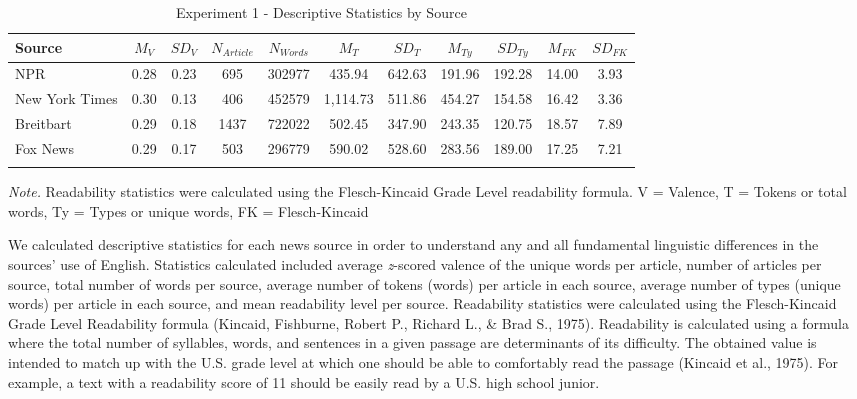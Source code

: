 \documentclass[
  english,
  man]{apa6}
\begin{document}
\begin{table}[tbp]

\begin{center}
\begin{threeparttable}

\caption{\label{tab:exp1-source-descriptives}Experiment 1 - Descriptive Statistics by Source}

\footnotesize{

\begin{tabular}{lcccccccccc}
\toprule
Source & $M_V$ & $SD_V$ & $N_{Article}$ & $N_{Words}$ & $M_T$ & $SD_T$ & $M_{Ty}$ & $SD_{Ty}$ & $M_{FK}$ & $SD_{FK}$\\
\midrule
NPR & 0.28 & 0.23 & 695 & 302977 & 435.94 & 642.63 & 191.96 & 192.28 & 14.00 & 3.93\\
New York Times & 0.30 & 0.13 & 406 & 452579 & 1,114.73 & 511.86 & 454.27 & 154.58 & 16.42 & 3.36\\
Breitbart & 0.29 & 0.18 & 1437 & 722022 & 502.45 & 347.90 & 243.35 & 120.75 & 18.57 & 7.89\\
Fox News & 0.29 & 0.17 & 503 & 296779 & 590.02 & 528.60 & 283.56 & 189.00 & 17.25 & 7.21\\
\bottomrule
\addlinespace
\end{tabular}

}

\begin{tablenotes}[para]
\normalsize{\textit{Note.} Readability statistics were calculated using the Flesch-Kincaid Grade Level readability formula. V = Valence, T = Tokens or total words, Ty = Types or unique words, FK = Flesch-Kincaid}
\end{tablenotes}

\end{threeparttable}
\end{center}

\end{table}

We calculated descriptive statistics for each news source in order to understand any and all fundamental linguistic differences in the sources' use of English. Statistics calculated included average \emph{z}-scored valence of the unique words per article, number of articles per source, total number of words per source, average number of tokens (words) per article in each source, average number of types (unique words) per article in each source, and mean readability level per source. Readability statistics were calculated using the Flesch-Kincaid Grade Level Readability formula (Kincaid, Fishburne, Robert P., Richard L., \& Brad S., 1975). Readability is calculated using a formula where the total number of syllables, words, and sentences in a given passage are determinants of its difficulty. The obtained value is intended to match up with the U.S. grade level at which one should be able to comfortably read the passage (Kincaid et al., 1975). For example, a text with a readability score of 11 should be easily read by a U.S. high school junior.
\end{document}
